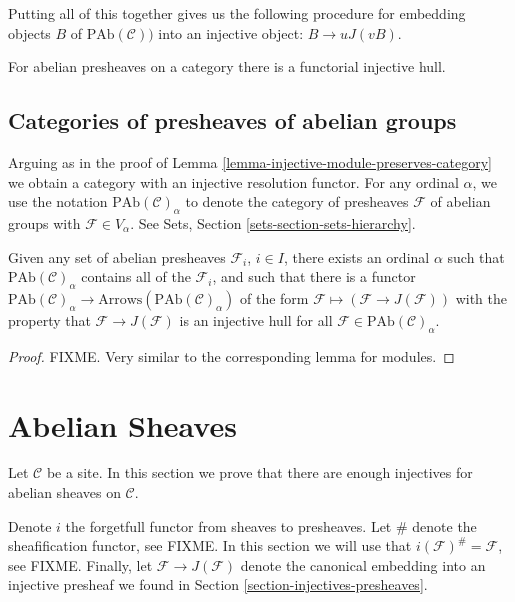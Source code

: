 \medskip\noindent
Putting all of this together gives us the following procedure
for embedding objects $B$ of $\text{PAb}(\mathcal{C}))$ into
an injective object: $B \to uJ(vB)$.

\begin{proposition}
\label{proposition-presheaves-injectives}
For abelian presheaves on a category there is a functorial injective hull.
\end{proposition}

\subsection{Categories of presheaves of abelian groups}
\label{subsection-category-presheaves}

\noindent
Arguing as in the proof of
Lemma \ref{lemma-injective-module-preserves-category} we obtain a category
with an injective resolution functor. For any ordinal $\alpha$,
we use the notation $\text{PAb}(\mathcal{C})_\alpha$ to denote the category
of presheaves $\mathcal{F}$ of abelian groups with $\mathcal{F} \in V_\alpha$.
See Sets, Section \ref{sets-section-sets-hierarchy}.

\begin{lemma} 
\label{lemma-injective-presheaf-preserves-category}
Given any set of abelian presheaves $\mathcal{F}_i$, $i\in I$, there
exists an ordinal $\alpha$ such that $\text{PAb}(\mathcal{C})_\alpha$
contains all of the $\mathcal{F}_i$, and such that there is a functor
$\text{PAb}(\mathcal{C})_\alpha \to
\text{Arrows}(\text{PAb}(\mathcal{C})_\alpha)$
of the form $\mathcal{F} \mapsto (\mathcal{F} \to J(\mathcal{F}))$
with the property that $\mathcal{F} \to J(\mathcal{F})$ is an injective
hull for all $\mathcal{F} \in \text{PAb}(\mathcal{C})_\alpha$.
\end{lemma}

\begin{proof}
FIXME. Very similar to the corresponding lemma for modules.
\end{proof}

\section{Abelian Sheaves}
\label{section-injectives-sheaves}

\noindent
Let $\mathcal{C}$ be a site. In this section we prove that there are 
enough injectives for abelian sheaves on $\mathcal{C}$. 

\medskip\noindent
Denote $i$ the forgetfull functor from sheaves to presheaves. Let
$\#$ denote the sheafification functor, see FIXME. In this section we
will use that $i(\mathcal{F})^\# = \mathcal{F}$, see FIXME.
Finally, let $\mathcal{F} \to J(\mathcal{F})$ denote the canonical
embedding into an injective presheaf we found in 
Section \ref{section-injectives-presheaves}. 

